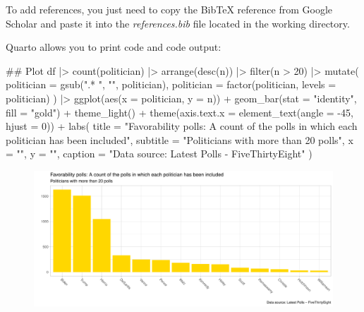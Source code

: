 \documentclass[
  12pt,
  letterpaper,
  DIV=11,
  numbers=noendperiod]{scrartcl}
\newenvironment{Shaded}{}{}
\newcommand{\AttributeTok}[1]{\textcolor[rgb]{0.65,0.15,0.64}{#1}}
\newcommand{\DecValTok}[1]{\textcolor[rgb]{0.60,0.41,0.00}{#1}}
\newcommand{\DocumentationTok}[1]{\textcolor[rgb]{0.89,0.34,0.29}{#1}}
\newcommand{\FunctionTok}[1]{\textcolor[rgb]{0.25,0.47,0.95}{#1}}
\newcommand{\NormalTok}[1]{\textcolor[rgb]{0.22,0.23,0.26}{#1}}
\newcommand{\SpecialCharTok}[1]{\textcolor[rgb]{0.00,0.52,0.74}{#1}}
\newcommand{\StringTok}[1]{\textcolor[rgb]{0.31,0.63,0.31}{#1}}
\begin{document}
To add references, you just need to copy the BibTeX reference from
Google Scholar and paste it into the \emph{references.bib} file located
in the working directory.

Quarto allows you to print code and code output:

\begin{Shaded}
\begin{Highlighting}[]
\DocumentationTok{\#\# Plot}
\NormalTok{df }\SpecialCharTok{|\textgreater{}}
  \FunctionTok{count}\NormalTok{(politician) }\SpecialCharTok{|\textgreater{}}
  \FunctionTok{arrange}\NormalTok{(}\FunctionTok{desc}\NormalTok{(n)) }\SpecialCharTok{|\textgreater{}}
  \FunctionTok{filter}\NormalTok{(n }\SpecialCharTok{\textgreater{}} \DecValTok{20}\NormalTok{) }\SpecialCharTok{|\textgreater{}}
  \FunctionTok{mutate}\NormalTok{(}
    \AttributeTok{politician =} \FunctionTok{gsub}\NormalTok{(}\StringTok{".* "}\NormalTok{, }\StringTok{""}\NormalTok{, politician),}
    \AttributeTok{politician =} \FunctionTok{factor}\NormalTok{(politician, }\AttributeTok{levels =}\NormalTok{ politician)}
\NormalTok{  ) }\SpecialCharTok{|\textgreater{}}
  \FunctionTok{ggplot}\NormalTok{(}\FunctionTok{aes}\NormalTok{(}\AttributeTok{x =}\NormalTok{ politician, }\AttributeTok{y =}\NormalTok{ n))  }\SpecialCharTok{+}
  \FunctionTok{geom\_bar}\NormalTok{(}\AttributeTok{stat =} \StringTok{"identity"}\NormalTok{, }\AttributeTok{fill =} \StringTok{"gold"}\NormalTok{) }\SpecialCharTok{+}
  \FunctionTok{theme\_light}\NormalTok{() }\SpecialCharTok{+} 
  \FunctionTok{theme}\NormalTok{(}\AttributeTok{axis.text.x =} \FunctionTok{element\_text}\NormalTok{(}\AttributeTok{angle =} \SpecialCharTok{{-}}\DecValTok{45}\NormalTok{, }\AttributeTok{hjust =} \DecValTok{0}\NormalTok{)) }\SpecialCharTok{+}
  \FunctionTok{labs}\NormalTok{(}
    \AttributeTok{title =} \StringTok{"Favorability polls: A count of the polls in which each politician has been included"}\NormalTok{,}
    \AttributeTok{subtitle =} \StringTok{"Politicians with more than 20 polls"}\NormalTok{,}
    \AttributeTok{x =} \StringTok{""}\NormalTok{,}
    \AttributeTok{y =} \StringTok{""}\NormalTok{,}
    \AttributeTok{caption =} \StringTok{"Data source: Latest Polls {-} FiveThirtyEight"}
\NormalTok{  )}
\end{Highlighting}
\end{Shaded}

\begin{figure}[H]

{\centering \includegraphics{assignment_1_files/figure-pdf/unnamed-chunk-4-1.pdf}

}

\end{figure}
\end{document}
